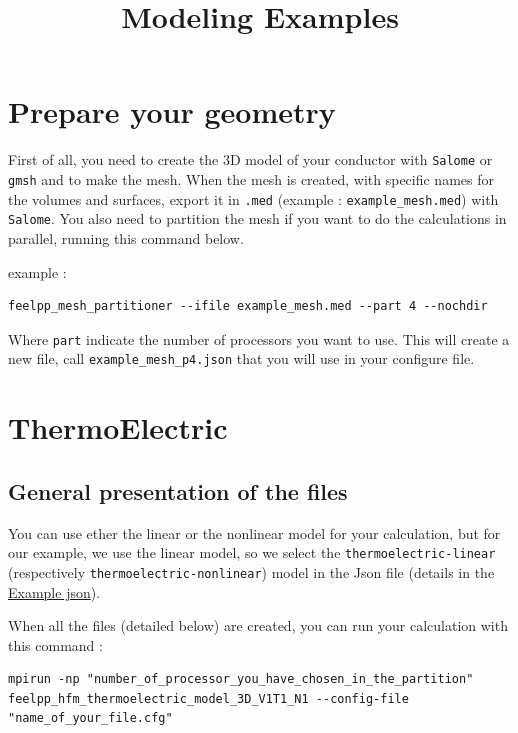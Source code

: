\documentclass[11pt]{amsart}
\title{Modeling Examples}
\author{}
\date{}
\begin{document}
\maketitle
\tableofcontents
\hypertarget{x-\textbf{prepare-your-geometry}}{\section{\textbf{Prepare your geometry}}}
First of all, you need to create the 3D model of your conductor with \texttt{Salome} or \texttt{gmsh} and to make the mesh.
When the mesh is created, with specific names for the volumes and surfaces, export it in \texttt{.med} (example : \texttt{example_mesh.med}) with \texttt{Salome}.
You also need to partition the mesh if you want to do the calculations in parallel, running this command below.


example :


\begin{verbatim}
feelpp_mesh_partitioner --ifile example_mesh.med --part 4 --nochdir
\end{verbatim}

Where \texttt{part} indicate the number of processors you want to use.
This will create a new file, call \texttt{example_mesh_p4.json} that you will use in your configure file.


\hypertarget{x-\textbf{thermoelectric}}{\section{\textbf{ThermoElectric}}}
\hypertarget{x-general-presentation-of-the-files}{\subsection{General presentation of the files}}
You can use ether the linear or the nonlinear model for your calculation, but for our example, we use the linear model, so we select the \texttt{thermoelectric-linear} (respectively \texttt{thermoelectric-nonlinear}) model in the Json file (details in the \hyperlink{code.json}{Example  json}).


When all the files (detailed below) are created, you can run your calculation with this command :


\begin{verbatim}
mpirun -np "number_of_processor_you_have_chosen_in_the_partition" feelpp_hfm_thermoelectric_model_3D_V1T1_N1 --config-file "name_of_your_file.cfg"
\end{verbatim}
\end{document}
